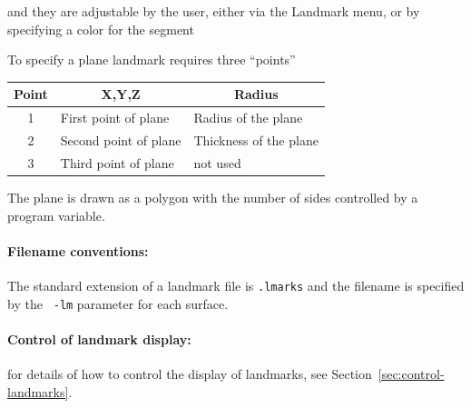   and they are adjustable by the user, either via the Landmark menu, or by
  specifying a color for the segment

  To specify a plane landmark requires three ``points''
  \begin{center}
  \begin{tabular}{|c|l|l|} \hline
    \multicolumn{1}{|c|}{Point} &
    \multicolumn{1}{|c|}{X,Y,Z} &
    \multicolumn{1}{|c|}{Radius} \\ \hline
  1 & First point of plane & Radius of the plane \\
  2 & Second point of plane & Thickness of the plane \\
  3 & Third point of plane & not used \\ \hline
  \end{tabular}
  \end{center}
  The plane is drawn as a polygon with the number of sides controlled by a
  program variable. 

\paragraph{Filename conventions: } The standard extension of a
  landmark file is {\tt .lmarks} and the filename is specified by the {\tt
  -lm} parameter for each surface.

\paragraph{Control of landmark display: } for details of how to control the
display of landmarks, see Section~\ref{sec:control-landmarks}.



